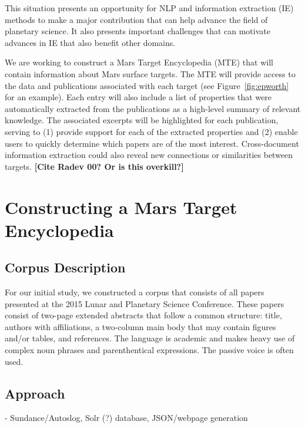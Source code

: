 \documentclass[letterpaper]{article}
\begin{document}

This situation presents an opportunity for NLP and information
extraction (IE) methods to make a major contribution that can help
advance the field of planetary science.  It also presents important
challenges that can motivate advances in IE that also benefit other
domains. 

We are working to construct a Mars Target Encyclopedia (MTE) that will
contain information about Mars surface targets.  The MTE will provide
access to the data and publications associated with each target (see
Figure~\ref{fig:epworth} for an example).  Each entry will also
include a list of properties that were automatically extracted from
the publications as a high-level summary of relevant knowledge.  The
associated excerpts will be highlighted for each publication, serving
to (1) provide support for each of the extracted properties and (2)
enable users to quickly determine which papers are of the most
interest.  Cross-document information extraction could also reveal new
connections or similarities between targets. {\bf [Cite Radev 00? Or
is this overkill?]}


\section{Constructing a Mars Target Encyclopedia}

\subsection{Corpus Description}

For our initial study, we constructed a corpus that consists of all
papers presented at the 2015 Lunar and Planetary Science Conference.
These papers consist of two-page extended abstracts that follow a
common structure: title, authors with affiliations, a two-column main
body that may contain figures and/or tables, and references.  The
language is academic and makes heavy use of complex noun phrases and
parenthentical expressions.  The passive voice is often used.


\subsection{Approach}
- Sundance/Autoslog, Solr (?) database, JSON/webpage generation
\end{document}
